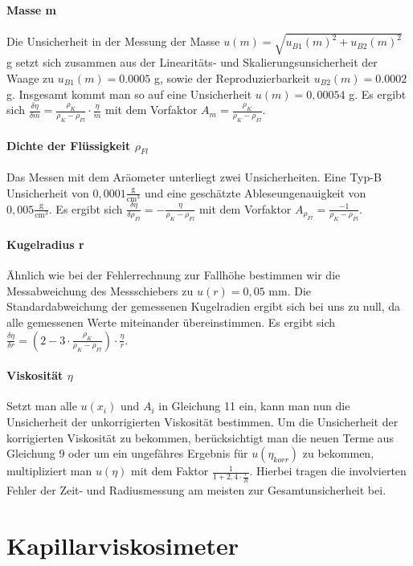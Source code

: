 \documentclass{article}
\begin{document}
\paragraph{Masse m}
Die Unsicherheit in der Messung der Masse $u(m) = \sqrt{u_{B1}(m)^2 + u_{B2}(m)^2}$ g setzt sich zusammen aus der Linearitäts- und Skalierungsunsicherheit der Waage zu $u_{B1}(m)= 0.0005$ g, sowie der Reproduzierbarkeit $u_{B2}(m)= 0.0002$ g. Insgesamt kommt man so auf eine Unsicherheit $u(m)=0,00054$ g. Es ergibt sich $\frac{\delta  \eta}{\delta m} = \frac{\rho_K}{\rho_K - \rho_{Fl}} \cdot \frac{\eta}{m}$ mit dem Vorfaktor $A_m = \frac{\rho_K}{\rho_K - \rho_{Fl}}$. 
\paragraph{Dichte der Flüssigkeit $\rho_{Fl}$}
Das Messen mit dem Aräometer unterliegt zwei Unsicherheiten. Eine Typ-B Unsicherheit von $0,0001 \frac{\textrm{g}}{\textrm{cm}^3}$ \cite{6} und eine geschätzte Ableseungenauigkeit von $0,005 \frac{\textrm{g}}{\textrm{cm}^3}$. Es ergibt sich $\frac{\delta \eta}{\delta \rho_{Fl}} = - \frac{\eta}{\rho_K - \rho_{Fl}}$ mit dem Vorfaktor $A_{\rho_{Fl}} = \frac{-1}{\rho_K - \rho_{Fl}}$. 
\paragraph{Kugelradius r}
Ähnlich wie bei der Fehlerrechnung zur Fallhöhe bestimmen wir die Messabweichung des Messschiebers zu $u(r)=0,05$ mm.
Die Standardabweichung der gemessenen Kugelradien ergibt sich bei uns zu null, da alle gemessenen Werte miteinander übereinstimmen. Es ergibt sich $\frac{\delta \eta}{\delta r}=(2-3 \cdot \frac{\rho_K}{\rho_K - \rho_{Fl}}) \cdot \frac{\eta}{r}$.
\paragraph{Viskosität $\eta$}
Setzt man alle $u(x_i)$ und $A_i$ in Gleichung 11 ein, kann man nun die Unsicherheit der unkorrigierten Viskosität bestimmen. Um die Unsicherheit der korrigierten Viskosität zu bekommen, berücksichtigt man die neuen Terme aus Gleichung 9 oder um ein ungefähres Ergebnis für $u(\eta_{korr})$ zu bekommen, multipliziert man $u(\eta)$ mit dem Faktor $\frac{1}{1+2,4 \cdot \frac{r}{R}}$. Hierbei tragen die involvierten Fehler der Zeit- und Radiusmessung am meisten zur Gesamtunsicherheit bei.
\section{Kapillarviskosimeter}
\end{document}

